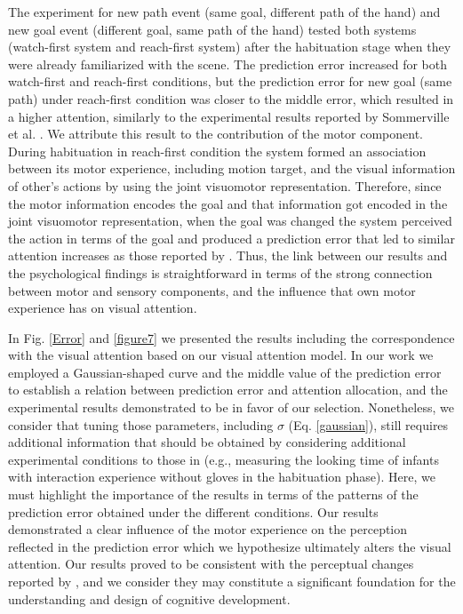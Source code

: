 \documentclass[conference]{IEEEtran}
\begin{document}
The experiment for new path event (same goal, different path of the hand) and new goal event (different goal, same path of the hand) tested both systems (watch-first system and reach-first system) after the habituation stage when they were already familiarized with the scene. The prediction error increased for both watch-first and reach-first conditions, but the prediction error for new goal (same path) under reach-first condition was closer to the middle error, which resulted in a higher attention, similarly to the experimental results reported by Sommerville et al. \cite{sommerville2005action}. We attribute this result to the contribution of the motor component. During habituation in reach-first condition the system formed an association between its motor experience, including motion target, and the visual information of other's actions by using the joint visuomotor representation. Therefore, since the motor information encodes the goal and that information got encoded in the joint visuomotor representation, when the goal was changed the system perceived the action in terms of the goal and produced a prediction error that led to similar attention increases as those reported by \cite{sommerville2005action}. Thus, the link between our results and the psychological findings is straightforward in terms of the strong connection between motor and sensory components, and the influence that own motor experience has on visual attention.

In Fig. \ref{Error} and \ref{figure7} we presented the results including the correspondence with the visual attention based on our visual attention model. In our work we employed a Gaussian-shaped curve and the middle value of the prediction error to establish a relation between prediction error and attention allocation, and the experimental results demonstrated to be in favor of our selection. Nonetheless, we consider that tuning those parameters, including \(\sigma\) (Eq. \ref{gaussian}), still requires additional information that should be obtained by considering additional experimental conditions to those in \cite{sommerville2005action} (e.g., measuring the looking time of infants with interaction experience without gloves in the habituation phase). Here, we must highlight the importance of the results in terms of the patterns of the prediction error obtained under the different conditions. Our results demonstrated a clear influence of the motor experience on the perception reflected in the prediction error which we hypothesize ultimately alters the visual attention. Our results proved to be consistent with the perceptual changes reported by \cite{sommerville2005action}, and we consider they may constitute a significant foundation for the understanding and design of cognitive development.
\end{document}
